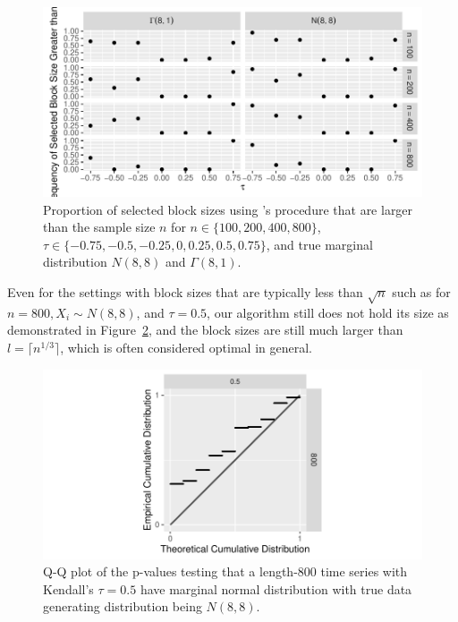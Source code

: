 \documentclass[12pt]{article}
\begin{document}
\begin{figure}[tbp]
  \centering
  \includegraphics[scale=1]{figures/large_block}
  \caption{Proportion of selected block sizes using
  \citet{politis2004automatic}'s procedure that are larger than the sample size
    $n$ for $n \in \{100, 200, 400, 800\}$,
    $\tau \in \{-0.75, -0.5, -0.25, 0, 0.25, 0.5, 0.75\}$, and true marginal distribution
    $N(8,8)$ and $\Gamma(8,1)$.
  }
  \label{fig:large_block}
\end{figure}

Even for the settings with block sizes that are typically less than
$\sqrt{n}$ such as for $n = 800, X_i \sim N(8, 8)$, and $\tau = 0.5$, our 
algorithm still does not hold its size as demonstrated in 
Figure~\ref{fig:my_setting}, and the block
sizes are still much larger than $l = \lceil n^{1/3} \rceil$, which is often
considered optimal in general.

\begin{figure}[tbp]
  \centering
  \includegraphics[scale=1]{figures/my_setting}
  \caption{Q-Q plot of the p-values testing that a length-800 time series with
    Kendall's $\tau = 0.5$
    have marginal normal distribution with true data generating distribution
    being $N(8,8)$.
  }
  \label{fig:my_setting}
\end{figure}
\end{document}
